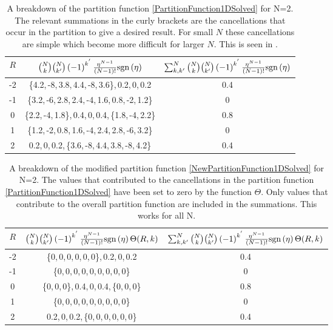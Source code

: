 \renewcommand{\arraystretch}{1.5}
\begin{table}[h]
\centering
    \begin{tabular}{ c c c } \hline
    $R$ & $\binom{N}{k}\binom{N}{k'}\left(-1\right)^{k^{'}}\frac{\eta^{N-1}}{\left(N-1\right)!}\text{sgn}\left(\eta\right)$ & $\sum_{k,k'}^{N}\binom{N}{k}\binom{N}{k'}\left(-1\right)^{k^{'}}\frac{\eta^{N-1}}{\left(N-1\right)!}\text{sgn}\left(\eta\right)$ \\ [1ex] \hline\hline 
    -2  & \{4.2,\,-8,\,3.8,\,4.4,\,-8,\,3.6\},\,0.2,\,0,\,0.2  & 0.4 \\ 
    -1  & \{3.2,\,-6,\,2.8,\,2.4,\,-4,\,1.6,\,0.8,\,-2,\,1.2\} & 0   \\ 
    0   & \{2.2,\,-4,\,1.8\},\,0.4,\,0,\,0.4,\,\{1.8,\,-4,\,2.2\}  & 0.8 \\ 
    1   & \{1.2,\,-2,\,0.8,\,1.6,\,-4,\,2.4,\,2.8,\,-6,\,3.2\} & 0   \\ 
    2   & 0.2,\,0,\,0.2,\,\{3.6,\,-8,\,4.4,\,3.8,\,-8,\,4.2\}  & 0.4 \\ [1ex] \hline
    \end{tabular}
\caption{A breakdown of the partition function \eqref{PartitionFunction1DSolved} for N=2. The relevant summations in the curly brackets are the cancellations that occur in the partition to give a desired result. For small $N$ these cancellations are simple which become more difficult for larger $N$. This is seen in .}
\label{table:kernal}
\end{table}

\begin{table}[h]
\centering
    \begin{tabular}{ c c c } \hline
    $R$ & $\binom{N}{k}\binom{N}{k'}\left(-1\right)^{k^{'}}\frac{\eta^{N-1}}{\left(N-1\right)!}\text{sgn}\left(\eta\right)\Theta(R,k)$ & $\sum_{k,k'}^{N}\binom{N}{k}\binom{N}{k'}\left(-1\right)^{k^{'}}\frac{\eta^{N-1}}{\left(N-1\right)!}\text{sgn}\left(\eta\right)\Theta(R,k)$ \\ [1ex] \hline\hline 
    -2  & \{0,\,0,\,0,\,0,\,0,\,0\},\,0.2,\,0,\,0.2  & 0.4 \\ 
    -1  & \{0,\,0,\,0,\,0,\,0,\,0,\,0,\,0,\,0\} & 0   \\ 
    0   & \{0,\,0,\,0\},\,0.4,\,0,\,0.4,\,\{0,\,0,\,0\}  & 0.8 \\ 
    1   & \{0,\,0,\,0,\,0,\,0,\,0,\,0,\,0,\,0\} & 0   \\ 
    2   & 0.2,\,0,\,0.2,\,\{0,\,0,\,0,\,0,\,0,\,0\}  & 0.4 \\ [1ex] \hline
    \end{tabular}
\caption{A breakdown of the modified partition function \eqref{NewPartitionFunction1DSolved} for N=2. The values that contributed to the cancellations in the partition function \eqref{PartitionFunction1DSolved} have been set to zero by the function $\Theta$. Only values that contribute to the overall partition function are included in the summations. This works for all N.}
\label{table:mod_kernal}
\end{table}


